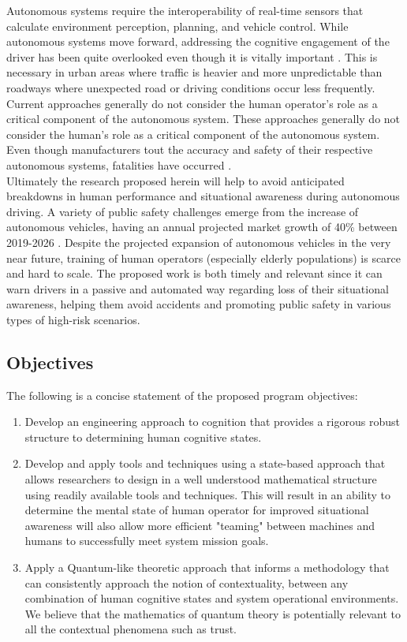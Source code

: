 Autonomous systems require the interoperability of real-time sensors that calculate environment perception, planning, and vehicle control. While autonomous systems move forward, addressing the cognitive engagement of the driver has been quite overlooked even though it is vitally important \cite{Kaber2017}. This is necessary in urban areas where traffic is heavier and more unpredictable than roadways where unexpected road or driving conditions occur less frequently. Current approaches generally do not consider the human operator's role as a critical component of the autonomous system. These approaches generally do not consider the human's role as a critical component of the autonomous system. Even though manufacturers tout the accuracy and safety of their respective autonomous systems, fatalities have occurred \cite{NTSB2017}.\\

Ultimately the research proposed herein will help to avoid anticipated breakdowns in human performance and situational awareness during autonomous driving. A variety of public safety challenges emerge from the increase of autonomous vehicles, having an annual projected market growth of 40\% between 2019-2026 \cite{Kumar2018}. Despite the projected expansion of autonomous vehicles in the very near future, training of human operators (especially elderly populations) is scarce and hard to scale. The proposed work is both timely and relevant since it can warn drivers in a passive and automated way regarding loss of their situational awareness, helping them avoid accidents and promoting public safety in various types of high-risk scenarios.

\subsection{Objectives}
The following is a concise statement of the proposed program objectives:\
\begin{enumerate}
  \item Develop an engineering approach to cognition that provides a rigorous robust structure to determining human cognitive states. 
  \item Develop and apply tools and techniques using a state-based approach that allows researchers to design in a well understood mathematical structure using readily available tools and techniques. This will result in an ability to determine the mental state of human operator for improved situational awareness will also allow more efficient "teaming" between machines and humans to successfully meet system mission goals. 
  \item Apply a Quantum-like theoretic approach that informs a methodology that can consistently approach the notion of contextuality, between any combination of human cognitive states and system operational environments. We believe that the mathematics of quantum theory is potentially relevant to all the contextual phenomena such as trust.
\end{enumerate}



